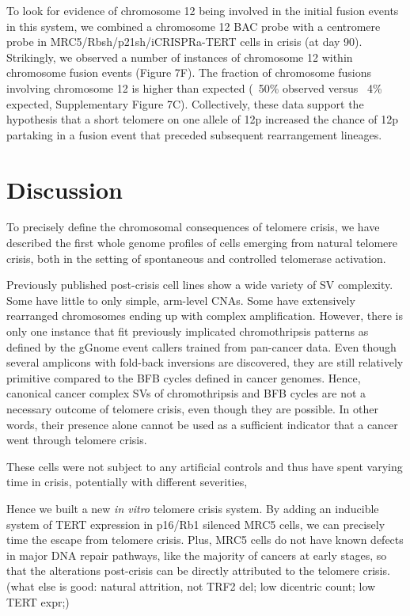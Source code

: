 \documentclass[phd,tocprelim]{cornell}
\begin{document}
To look for evidence of chromosome 12 being involved in the initial fusion events in this system, we combined a chromosome 12 BAC probe with a centromere probe in MRC5/Rbsh/p21sh/iCRISPRa-TERT cells in crisis (at day 90). Strikingly, we observed a number of instances of chromosome 12 within chromosome fusion events (Figure 7F). The fraction of chromosome fusions involving chromosome 12 is higher than expected (~50\% observed versus ~4\% expected, Supplementary Figure 7C). Collectively, these data support the hypothesis that a short telomere on one allele of 12p increased the chance of 12p partaking in a fusion event that preceded subsequent rearrangement lineages.

\section{Discussion}
To precisely define the chromosomal consequences of telomere crisis, we have described the first whole genome profiles of cells emerging from natural telomere crisis, both in the setting of spontaneous and controlled telomerase activation. 

Previously published post-crisis cell lines show a wide variety of SV complexity. Some have little to only simple, arm-level CNAs. Some have extensively rearranged chromosomes ending up with complex amplification. However, there is only one instance that fit previously implicated chromothripsis patterns as defined by the gGnome event callers trained from pan-cancer data. Even though several amplicons with fold-back inversions are discovered, they are still relatively primitive compared to the BFB cycles defined in cancer genomes. Hence, canonical cancer complex SVs of chromothripsis and BFB cycles are not a necessary outcome of telomere crisis, even though they are possible. In other words, their presence alone cannot be used as a sufficient indicator that a cancer went through telomere crisis.

These cells were not subject to any artificial controls and thus have spent varying time in crisis, potentially with different severities,

Hence we built a new \textit{in vitro} telomere crisis system. By adding an inducible system of TERT expression in p16/Rb1 silenced MRC5 cells, we can precisely time the escape from telomere crisis. Plus, MRC5 cells do not have known defects in major DNA repair pathways, like the majority of cancers at early stages, so that the alterations post-crisis can be directly attributed to the telomere crisis. (what else is good: natural attrition, not TRF2 del; low dicentric count; low TERT expr;)
\end{document}
